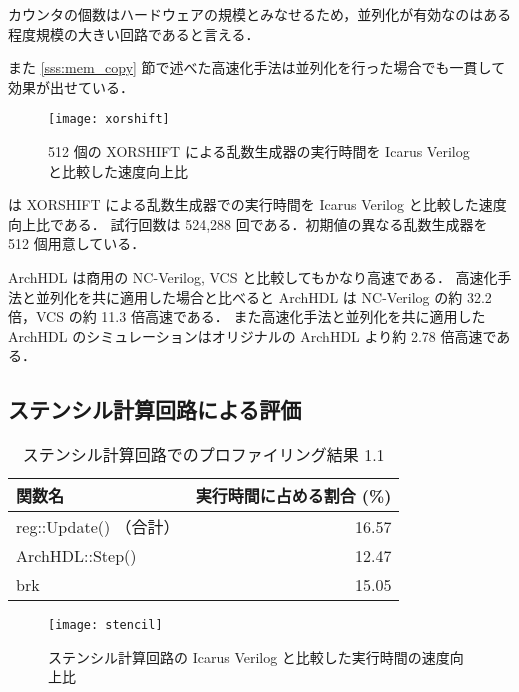 カウンタの個数はハードウェアの規模とみなせるため，並列化が有効なのはある程度規模の大きい回路であると言える．

また \ref{sss:mem_copy} 節で述べた高速化手法は並列化を行った場合でも一貫して効果が出せている．

\begin{figure}[t]
 \centering
 \texttt{[image: xorshift]}
 \caption{512 個の XORSHIFT による乱数生成器の実行時間を Icarus Verilog と比較した速度向上比}
 \label{fig:xorshift}
\end{figure}

 は XORSHIFT による乱数生成器での実行時間を Icarus Verilog と比較した速度向上比である．
試行回数は 524,288 回である．初期値の異なる乱数生成器を 512 個用意している．

ArchHDL は商用の NC-Verilog, VCS と比較してもかなり高速である．
高速化手法と並列化を共に適用した場合と比べると ArchHDL は NC-Verilog の約 32.2 倍，VCS の約 11.3 倍高速である．
また高速化手法と並列化を共に適用した ArchHDL のシミュレーションはオリジナルの ArchHDL より約 2.78 倍高速である．


\subsection{ステンシル計算回路による評価}


\begin{table}[t]
 \caption{ステンシル計算回路でのプロファイリング結果 1.1}
 \label{table:stencil_prof1.1}
 \begin{center}
  \begin{tabular}{lr} \toprule
  関数名 & 実行時間に占める割合 (\%) \\ \midrule
  reg::Update() （合計） & 16.57 \\
  ArchHDL::Step() & 12.47 \\
  brk & 15.05 \\ \bottomrule
  \end{tabular}
 \end{center}
\end{table}

\fi

\begin{figure}[t]
 \centering
 \texttt{[image: stencil]}
 \caption{ステンシル計算回路の Icarus Verilog と比較した実行時間の速度向上比}
 \label{fig:stencil}
\end{figure}

